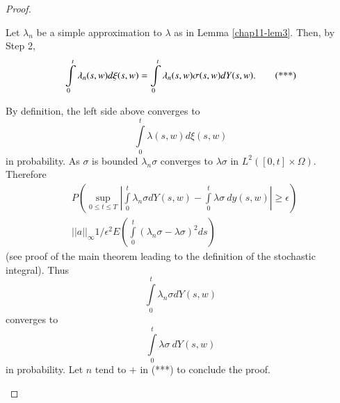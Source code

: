 \begin{proof}
\begin{step}
Let
$\lambda_{n}$ be a simple approximation to $\lambda$ as in Lemma
\ref{chap11-lem3}. Then, by Step 2,
\begin{equation*}
\int\limits^{t}_{0}\lambda_{n}(s,w)d\xi(s,w)=\int\limits^{t}_{0}\lambda_{n}(s,w)\sigma(s,w)dY(s,w).\tag{{*}**}
\end{equation*}

By definition, the left side above converges to
$$
\int\limits^{t}_{0}\lambda(s,w)d\xi(s,w)
$$\pageoriginale
in probability. As $\sigma$ is bounded $\lambda_{n}\sigma$ converges
to $\lambda\sigma$ in $L^{2}([0,t]\times\Omega)$. Therefore
\begin{align*}
& P\left(\sup\limits_{0\leq t\leq
  T}|\int\limits^{t}_{0}\lambda_{n}\sigma
dY(s,w)-\int\limits^{t}_{0}\lambda\sigma\ dy(s,w)|\geq
\epsilon\right)\\
& ||a||_{\infty}1/\epsilon^{2}E\left(\int\limits^{t}_{0}(\lambda_{n}\sigma-\lambda\sigma)^{2}ds\right)
\end{align*}
(see proof of the main theorem leading to the definition of the
stochastic integral). Thus
$$
\int\limits^{t}_{0}\lambda_{n}\sigma dY(s,w)
$$
converges to
$$
\int\limits^{t}_{0}\lambda\sigma\ dY(s,w)
$$
in probability. Let $n$ tend to $+$ in (***) to conclude the proof.
\end{step}
\end{proof}
